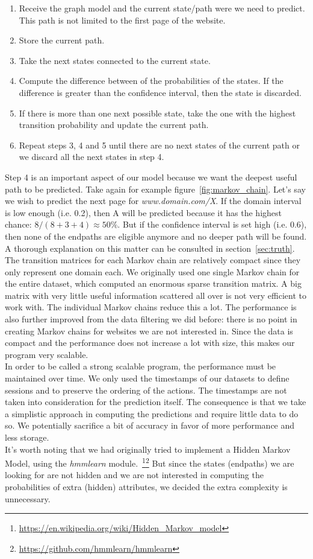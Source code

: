 \begin{enumerate}
	\item Receive the graph model and the current state/path were we need to predict. This path is not limited to the first page of the website.
	\item Store the current path.
	\item Take the next states connected to the current state.
	\item Compute the difference between of the probabilities of the states. If the difference is greater than the confidence interval, then the state is discarded.
	\item If there is more than one next possible state, take the one with the highest transition probability and update the current path.
	\item Repeat steps 3, 4 and 5 until there are no next states of the current path or we discard all the next states in step 4.
\end{enumerate}

Step 4 is an important aspect of our model because we want the deepest useful path to be predicted. Take again for example figure~\ref{fig:markov_chain}. Let's say we wish to predict the next page for \textit{www.domain.com/X}. If the domain interval is low enough (i.e. 0.2), then A will be predicted because it has the highest chance: $8/(8+3+4) \approx 50\%$. But if the confidence interval is set high (i.e. 0.6), then none of the endpaths are eligible anymore and no deeper path will be found. A thorough explanation on this matter can be consulted in section~\ref{sec:truth}.
\\[2ex]
The transition matrices for each Markov chain are relatively compact since they only represent one domain each. We originally used one single Markov chain for the entire dataset, which computed an enormous sparse transition matrix. A big matrix with very little useful information scattered all over is not very efficient to work with. The individual Markov chains reduce this a lot. The performance is also further improved from the data filtering we did before: there is no point in creating Markov chains for websites we are not interested in. Since the data is compact and the performance does not increase a lot with size, this makes our program very scalable.
\\[2ex]
In order to be called a strong scalable program, the performance must be maintained over time. We only used the timestamps of our datasets to define sessions and to preserve the ordering of the actions. The timestamps are not taken into consideration for the prediction itself. The consequence is that we take a simplistic approach in computing the predictions and require little data to do so. We potentially sacrifice a bit of accuracy in favor of more performance and less storage.
\\[2ex]
It's worth noting that we had originally tried to implement a Hidden Markov Model, using the \textit{hmmlearn} module.~\footnote{\url{https://en.wikipedia.org/wiki/Hidden_Markov_model}}\footnote{\url{https://github.com/hmmlearn/hmmlearn}} But since the states (endpaths) we are looking for are not hidden and we are not interested in computing the probabilities of extra (hidden) attributes, we decided the extra complexity is unnecessary.